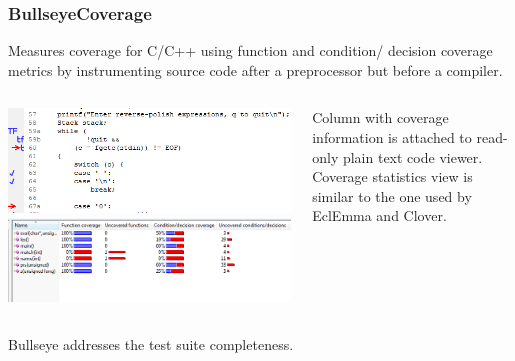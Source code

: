 \documentclass{beamer}
\begin{document}
\begin{frame}
  \frametitle{BullseyeCoverage}
Measures coverage for C/C++ using function and condition/ decision coverage metrics by instrumenting source code after a preprocessor but before a compiler.
\begin{columns}[T]
\begin{column}{.7\textwidth}
  \includegraphics[scale=0.5]{bullseye_source.png}\\
  \includegraphics[scale=0.4]{bullseye_stat.png}
\end{column}
\begin{column}{.3\textwidth}
Column with coverage information is attached to read-only plain text code viewer.\\
Coverage statistics view is similar to the one used by EclEmma and Clover.
\end{column}
\end{columns}
Bullseye addresses the test suite completeness.
\end{frame}
\end{document}
